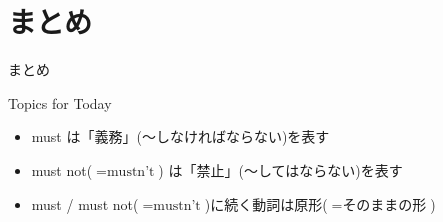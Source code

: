 \documentclass[aspectratio=169,xcolor={dvipsnames,table}]{beamer}
\begin{document}
\section{まとめ}
\begin{frame}[plain]{まとめ}
 \Large

\begin{exampleblock}{Topics for Today}
\small
\begin{itemize}[square]
 \item<2->  must は「義務」(〜しなければならない)を表す
 \item<3->  must not($=\text{mustn't}$) は「禁止」(〜してはならない)を表す
 \item<4->  must / must not($=\text{mustn't}$)に続く動詞は原形($=\text{そのままの形}$)
\end{itemize}

\end{exampleblock}

\vfill


\end{frame}
\end{document}
